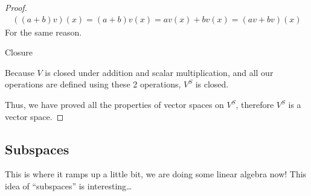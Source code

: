 \begin{enumerate}
\begin{proof}
    \begin{align*}
        ((a + b)v)(x) = (a + b)v(x) = av(x) + bv(x) = (av + bv)(x)
    \end{align*}
    For the same reason.


    Closure 

    Because $V$ is closed under addition and scalar multiplication, and all our operations are defined using these 2 operations, $V^S$ is closed.

    Thus, we have proved all the properties of vector spaces on $V^S$, therefore $V^S$ is a vector space.

\end{proof}

\end{enumerate}

\subsection{Subspaces}

This is where it ramps up a little bit, we are doing some linear algebra now! This idea of ``subspaces'' is interesting\dots

